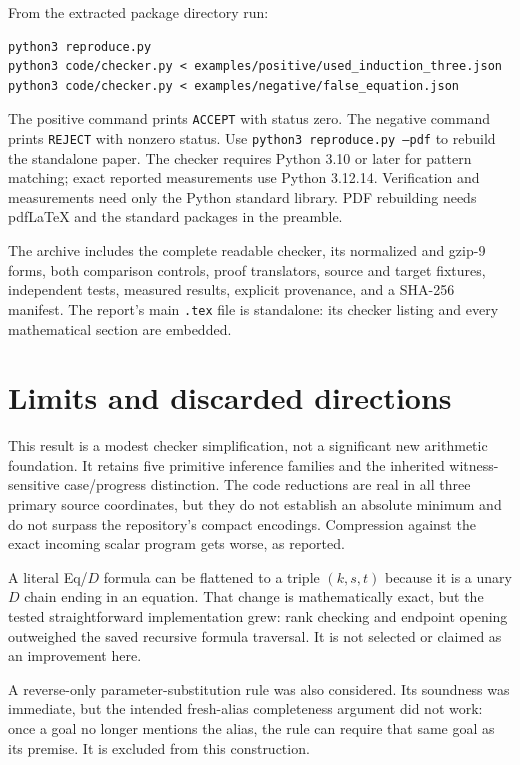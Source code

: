 From the extracted package directory run:
\begin{lstlisting}
python3 reproduce.py
python3 code/checker.py < examples/positive/used_induction_three.json
python3 code/checker.py < examples/negative/false_equation.json
\end{lstlisting}
The positive command prints \texttt{ACCEPT} with status zero. The negative
command prints \texttt{REJECT} with nonzero status.
Use \texttt{python3 reproduce.py --pdf} to rebuild the standalone paper.
The checker requires Python 3.10 or later for pattern matching; exact
reported measurements use Python 3.12.14. Verification and measurements
need only the Python standard library. PDF rebuilding needs pdfLaTeX
and the standard packages in the preamble.

The archive includes the complete readable checker, its normalized and
gzip-9 forms, both comparison controls, proof translators, source and
target fixtures, independent tests, measured results, explicit provenance,
and a SHA-256 manifest. The report's main \texttt{.tex} file is standalone:
its checker listing and every mathematical section are embedded.

\section{Limits and discarded directions}

This result is a modest checker simplification, not a significant new
arithmetic foundation. It retains five primitive inference families and
the inherited witness-sensitive case/progress distinction. The code
reductions are real in all three primary source coordinates, but they
do not establish an absolute minimum and do not surpass the repository's
compact encodings. Compression against the exact incoming scalar program
gets worse, as reported.

A literal Eq/$D$ formula can be flattened to a triple $(k,s,t)$ because it
is a unary $D$ chain ending in an equation. That change is mathematically
exact, but the tested straightforward implementation grew: rank checking
and endpoint opening outweighed the saved recursive formula traversal.
It is not selected or claimed as an improvement here.

A reverse-only parameter-substitution rule was also considered. Its
soundness was immediate, but the intended fresh-alias completeness
argument did not work: once a goal no longer mentions the alias, the
rule can require that same goal as its premise. It is excluded from this
construction.

